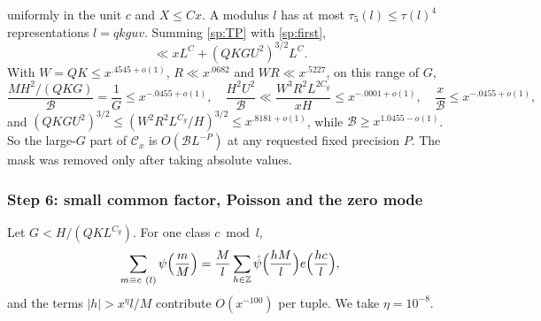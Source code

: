 uniformly in the unit $c$ and $X\le Cx$. A modulus $l$ has at most
$\tau_5(l)\le\tau(l)^4$ representations $l=qkguv$. Summing \eqref{sp:TP}
with \eqref{sp:first},
\[
 \ll xL^{C}+(QKGU^2)^{3/2}L^{C}.
\]
With $W=QK\le x^{.4545+o(1)}$, $R\ll x^{.0682}$ and $WR\ll x^{.5227}$, on
this range of $G$,
\[
 \frac{MH^2/(QKG)}{\mathcal B}=\frac1G\le x^{-.0455+o(1)},\quad
 \frac{H^2U^2}{\mathcal B}\ll\frac{W^3R^2L^{2C_g}}{xH}\le x^{-.0001+o(1)},\quad
 \frac x{\mathcal B}\le x^{-.0455+o(1)},
\]
and $(QKGU^2)^{3/2}\le(W^2R^2L^{C_g}/H)^{3/2}\le x^{.8181+o(1)}$, while
$\mathcal B\ge x^{1.0455-o(1)}$. So the large-$G$ part of
$\mathcal C_x$ is $O(\mathcal BL^{-P})$ at any requested fixed
precision $P$. The mask was removed only after taking absolute values.

\subsubsection*{Step 6: small common factor, Poisson and the zero mode}
Let $G<H/(QKL^{C_g})$. For one class $c\bmod l$,
\begin{equation}\label{sp:c58-poisson}
 \sum_{m\equiv c\ (l)}\psi\Bigl(\frac mM\Bigr)=\frac Ml\sum_{h\in\mathbb Z}
 \hat\psi\Bigl(\frac{hM}l\Bigr)e\Bigl(\frac{hc}l\Bigr),
\end{equation}
and the terms $|h|>x^{\eta}l/M$ contribute $O(x^{-100})$ per tuple. We take
$\eta=10^{-8}$.

